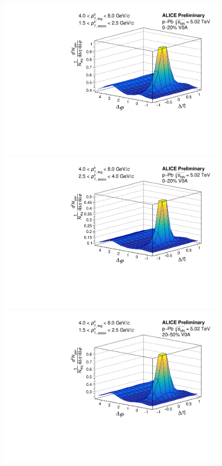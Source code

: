 \begin{figure}[ht]
	\centering
	\begin{minipage}{0.48\textwidth}
		\includegraphics[width=\textwidth]{figures/analysis/h_h_2d_mixcor_fancy_label_0_20_lowpt.pdf}
	\end{minipage}
	\begin{minipage}{0.48\textwidth}
		\includegraphics[width=\textwidth]{figures/analysis/h_h_2d_mixcor_fancy_label_0_20_highpt.pdf}
	\end{minipage}
	\begin{minipage}{0.48\textwidth}
		\includegraphics[width=\textwidth]{figures/analysis/h_h_2d_mixcor_fancy_label_20_50_lowpt.pdf}

\end{minipage}
\end{figure}
